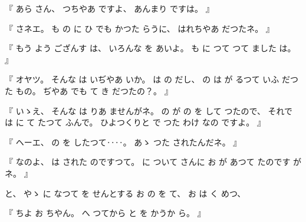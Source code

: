 %
『
あら
さん、
%
つちやあ
ですよ、
%
あんまり
ですは。
』

%
『
さネエ。
%
も
の
に
ひ
でも
かつた
らうに、
%
はれちやあ
だつたネ。
』

%
『
もう
よう
ござんす
は、
%
いろんな
を
あいよ。
%
も
に
つて
つて
ました
は。
』

%
『
オヤツ。
%
そんな
は
いぢやあ
いか。
%
は
の
だし、
%
の
は
が
るつて
いふ
だつた
もの。
%
ぢやあ
でも
て
き
だつたの？。
』

%
『
いゝえ、
%
そんな
は
りあ
ませんがネ。
%
の
が
の
を
して
つたので、
%
それで
は
に
て
たつて
ふんで。
%
ひよつくりと
で
つた
わけ
なの
ですよ。
』

%
『
ヘーエ、
%
の
を
したつて‥‥。
%
あゝ
つた
されたんだネ。
』

%
『
なのよ、
%
は
された
のですつて。
%
に
ついて
さんに
お
が
あつて
たのです
がネ。
』

%
と、
%
やゝ
に
なつて
を
せんとする
お
の
を
て、
%
お
は
く
めつ、

%
『
ちよ
お
ちやん。
%
へ
つてから
と
を
かうか
ら。
』

